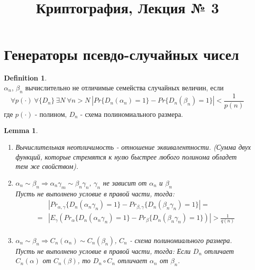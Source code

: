 \documentclass[a4paper]{article}
\title{Криптография, Лекция № 3}
\theoremstyle{definition}
\newtheorem{definition}{Definition}
\theoremstyle{plain}
\newtheorem{lemma}{Lemma}
\begin{document}
\maketitle

\section{Генераторы псевдо-случайных чисел}

\begin{definition}~\\
	$\alpha_n$, $\beta_n$ вычислительно не отличимые семейства случайных величин, если
	$$
		\forall p(\cdot)\ \forall \{D_n\}\ \exists N\ \forall n > N\ |Pr\{D_n(\alpha_n) = 1\} - Pr\{D_n(\beta_n) = 1\}| < \frac{1}{p(n)}	
	$$
	где $p(\cdot)$ - полином, $D_n$ - схема полиномиального размера.
\end{definition}

\begin{lemma}~\\
	\begin{enumerate}
		\item Вычислительная неотличимость - отношение эквивалентности. (Сумма двух функций, которые стремятся к нулю быстрее любого полинома обладет тем же свойством).
		\item $\alpha_n \sim \beta_n \Rightarrow \alpha_n \gamma_m \sim \beta_n \gamma_n$, $\gamma_n$ не зависит от $\alpha_n$ и $\beta_n$~\\
		
		Пусть не выполнено условие в правой части, тогда:
		\begin{eqnarray*}
			&& |Pr_{\alpha, \gamma}\{D_n(\alpha_n \gamma_n) = 1\} - Pr_{\beta, \gamma}\{D_n(\beta_n \gamma_n) = 1\}| =      \nonumber \\
   			& = & |E_{\gamma}(Pr_{\alpha}\{D_n(\alpha_n \gamma_n) = 1\} - Pr_{\beta}\{D_n(\beta_n \gamma_n) = 1\})| > \frac{1}{q(n)} \nonumber \\
        \end{eqnarray*}
		\item $\alpha_n \sim \beta_n \Rightarrow C_n(\alpha_n) \sim C_n(\beta_n)$, $C_n$ - схема полиномиального размера.~\\
		
		Пусть не выполнено условие в правой части, тогда:
		Если $D_n$ отличает $C_n(\alpha)$ от $C_n(\beta)$,
		то $D_n \circ C_n$ отличает $\alpha_n$ от $\beta_n$.
	\end{enumerate}
\end{lemma}
\end{document}

